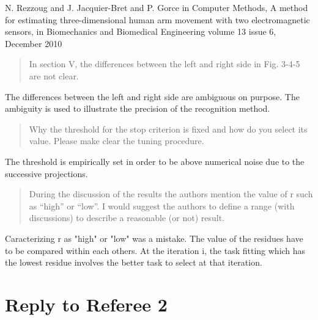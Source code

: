 \documentclass[11pt]{article}
\begin{document}
N. Rezzoug and J. Jacquier-Bret and P. Gorce in Computer Methods, 
A method for estimating three-dimensional human arm movement with two electromagnetic sensors,
in Biomechanics and Biomedical Engineering volume 13 issue 6, December 2010

\begin{quote}
 In section V, the differences between the left and right side in Fig. 3-4-5 are not clear.
\end{quote}
The differences between the left and right side are ambiguous on purpose.
The ambiguity is used to illustrate the precision of the recognition method.
 
\begin{quote}
 Why the threshold for the stop criterion is fixed and how do you select its value.  Please make clear the tuning procedure.
\end{quote}
The threshold is empirically set in order to be above numerical noise
due to the successive projections.

\begin{quote}
 During the discussion of the results the authors mention the value of r such as “high” or “low”. I would suggest the authors to define a range (with discussions) to describe a reasonable (or not) result.
\end{quote}
Caracterizing r as "high" or "low" was a mistake. The value of the residues have
to be compared within each others. At the iteration i, the task fitting which has the lowest 
residue involves the better task to select at that iteration.

\section{Reply to Referee 2}
\end{document}
